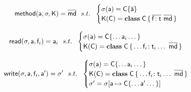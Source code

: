 \documentclass[a4paper,UKenglish,final]{lipics}
\begin{document}
\hrulefill


\begin{equation*}
{\sf{method}}({\sf{a}},\sigma,{\sf{K}}) = \overline{{\sf{md}}} ~~s.t.~~ \begin{cases}

 \sigma({\sf{a}}) =  {\sf{C}}\{\overline{{\sf{a}}}\} \\
 {\sf{K}}({\sf{C}}) = {\sf{\bf class}}\;{\sf{C}}\,\{\,\overline{ {{\sf{f}}}\!:{{\sf{t}}} }~\overline{{\sf{md}}}\,\}\\
\end{cases}
\end{equation*}


% 
% 
% 

\hrulefill


\begin{equation*}
\readf \s\a{\f_{i}} = \a_{i} ~~s.t.~~ \begin{cases}

 \s(\a) = \obj\C{\dots \a_{i} \dots}\\
 \K(\C) = \Class \C {\dots \Ftype{\f_{i}}{\t_{i}} \dots}{\b\md}\\
\end{cases}
\end{equation*}

\hrulefill


\begin{equation*}
\setf \s\a{\f_{i}}\ap = \sp ~~s.t.~~ \begin{cases}

 \s(\a) = \obj\C{\dots \a_{i} \dots}\\
 \K(\C) = \Class \C {\dots \Ftype{\f_{i}}{\t_{i}} \dots}{\b\md}\\
 \sp = \s[\Bind{\a}{\obj\C{\dots \ap \dots}}]
\end{cases}
\end{equation*}

\hrulefill

\end{document}

